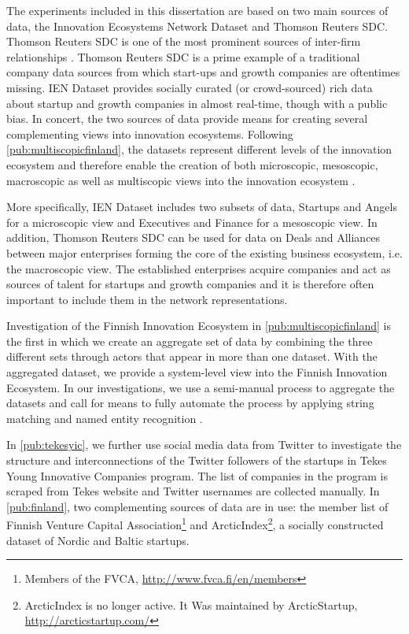 The experiments included in this dissertation are based on two main sources of data, the Innovation Ecosystems Network Dataset \citep{Rubens2010LeveragingMoves} and Thomson Reuters SDC. Thomson Reuters SDC is one of the most prominent sources of inter-firm relationships \citep{Schilling2009}. Thomson Reuters SDC is a prime example of a traditional company data sources from which start-ups and growth companies are oftentimes missing. IEN Dataset provides socially curated (or crowd-sourced) rich data about startup and growth companies in almost real-time, though with a public bias. In concert, the two sources of data provide means for creating several complementing views into innovation ecosystems. Following \ref{pub:multiscopicfinland}, the datasets represent different levels of the innovation ecosystem and therefore enable the creation of both microscopic, mesoscopic, macroscopic as well as multiscopic views into the innovation ecosystem \citep{Still2013NetworksFinland}.

More specifically, IEN Dataset includes two subsets of data, Startups and Angels for a microscopic view and Executives and Finance for a mesoscopic view. In addition, Thomson Reuters SDC can be used for data on Deals and Alliances between major enterprises forming the core of the existing business ecosystem, i.e. the macroscopic view. The established enterprises acquire companies and act as sources of talent for startups and growth companies and it is therefore often important to include them in the network representations.

Investigation of the Finnish Innovation Ecosystem in \ref{pub:multiscopicfinland} is the first in which we create an aggregate set of data by combining the three different sets through actors that appear in more than one dataset. With the aggregated dataset, we provide a system-level view into the Finnish Innovation Ecosystem. In our investigations, we use a semi-manual process to aggregate the datasets and call for means to fully automate the process by applying string matching \citep{Navarro2001AMatching} and named entity recognition \citep{Finkel2005IncorporatingSampling}.

In \ref{pub:tekesyic}, we further use social media data from Twitter to investigate the structure and interconnections of the Twitter followers of the startups in Tekes Young Innovative Companies program. The list of companies in the program is scraped from Tekes website and Twitter usernames are collected manually. In \ref{pub:finland}, two complementing sources of data are in use: the member list of Finnish Venture Capital Association\footnote{Members of the FVCA, \url{http://www.fvca.fi/en/members}} and ArcticIndex\footnote{ArcticIndex is no longer active. It Was maintained by ArcticStartup, \url{http://arcticstartup.com/}}, a socially constructed dataset of Nordic and Baltic startups.

